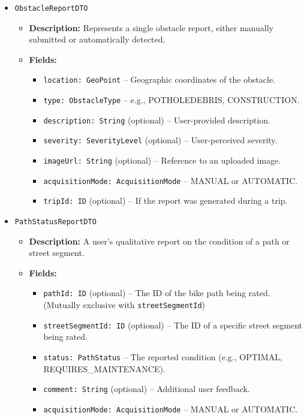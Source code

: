 \begin{itemize}
    \item \texttt{ObstacleReportDTO}
    \begin{itemize}
        \item \textbf{Description:} Represents a single obstacle report, either manually submitted or automatically detected.
        \item \textbf{Fields:}
        \begin{itemize}
            \item \texttt{location: GeoPoint} – Geographic coordinates of the obstacle.
            \item \texttt{type: ObstacleType} – e.g., POTHOLEDEBRIS, CONSTRUCTION.
            \item \texttt{description: String} (optional) – User-provided description.
            \item \texttt{severity: SeverityLevel} (optional) – User-perceived severity.
            \item \texttt{imageUrl: String} (optional) – Reference to an uploaded image.
            \item \texttt{acquisitionMode: AcquisitionMode} – MANUAL or AUTOMATIC.
            \item \texttt{tripId: ID} (optional) – If the report was generated during a trip.
        \end{itemize}
    \end{itemize}

    \item \texttt{PathStatusReportDTO}
    \begin{itemize}
        \item \textbf{Description:} A user's qualitative report on the condition of a path or street segment.
        \item \textbf{Fields:}
        \begin{itemize}
            \item \texttt{pathId: ID} (optional) – The ID of the bike path being rated. (Mutually exclusive with \texttt{streetSegmentId})
            \item \texttt{streetSegmentId: ID} (optional) – The ID of a specific street segment being rated.
            \item \texttt{status: PathStatus} – The reported condition (e.g., OPTIMAL, REQUIRES\_MAINTENANCE).
            \item \texttt{comment: String} (optional) – Additional user feedback.
            \item \texttt{acquisitionMode: AcquisitionMode} – MANUAL or AUTOMATIC.
        \end{itemize}
    \end{itemize}


\end{itemize}
